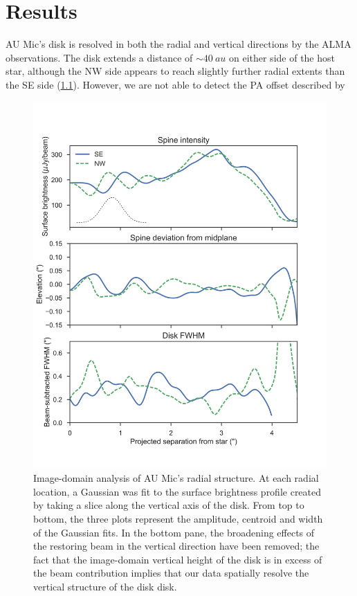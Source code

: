 \documentclass[12pt,oneside]{book}
\begin{document}
\chapter{Results}
AU Mic's disk is resolved in both the radial and vertical directions by the ALMA observations. The disk extends a distance of $\sim \SI{40}{au}$ on either side of the host star, although the NW side appears to reach slightly further radial extents than the SE side (\ref{fig: boccaletti}). However, we are not able to detect the PA offset described by \cite{boccaletti2015}

\begin{figure}
  \centering
  \includegraphics[width=.75\linewidth]{figures/3_boccaletti_plots}
  \caption{
  Image-domain analysis of AU Mic's radial structure. 
  At each radial location, a Gaussian was fit to the surface brightness profile created by taking a slice along the vertical axis of the disk. 
  From top to bottom, the three plots represent the amplitude, centroid and width of the Gaussian fits. 
  In the bottom pane, the broadening effects of the restoring beam in the vertical direction have been removed; the fact that the image-domain vertical height of the disk is in excess of the beam contribution implies that our data spatially resolve the vertical structure of the disk disk.} 
  \label{fig: boccaletti}
\end{figure}
\end{document}
